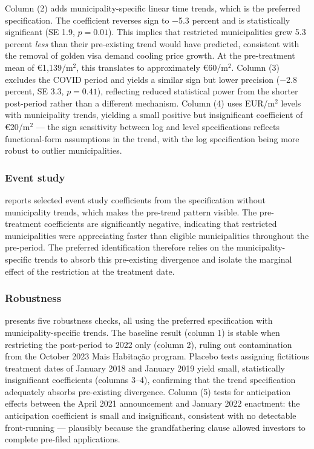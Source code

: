 \documentclass[12pt]{article}
\begin{document}
Column (2) adds municipality-specific linear time trends, which is the preferred specification. The coefficient reverses sign to $-$5.3 percent and is statistically significant (SE 1.9, $p = 0.01$). This implies that restricted municipalities grew 5.3 percent \textit{less} than their pre-existing trend would have predicted, consistent with the removal of golden visa demand cooling price growth. At the pre-treatment mean of \euro1,139/m$^2$, this translates to approximately \euro60/m$^2$. Column (3) excludes the COVID period and yields a similar sign but lower precision ($-$2.8 percent, SE 3.3, $p = 0.41$), reflecting reduced statistical power from the shorter post-period rather than a different mechanism. Column (4) uses EUR/m$^2$ levels with municipality trends, yielding a small positive but insignificant coefficient of \euro20/m$^2$ --- the sign sensitivity between log and level specifications reflects functional-form assumptions in the trend, with the log specification being more robust to outlier municipalities.



\subsubsection*{Event study}  reports selected event study coefficients from the specification without municipality trends, which makes the pre-trend pattern visible. The pre-treatment coefficients are significantly negative, indicating that restricted municipalities were appreciating faster than eligible municipalities throughout the pre-period. The preferred identification therefore relies on the municipality-specific trends to absorb this pre-existing divergence and isolate the marginal effect of the restriction at the treatment date.



\subsubsection*{Robustness}  presents five robustness checks, all using the preferred specification with municipality-specific trends. The baseline result (column 1) is stable when restricting the post-period to 2022 only (column 2), ruling out contamination from the October 2023 Mais Habita\c{c}\~{a}o program. Placebo tests assigning fictitious treatment dates of January 2018 and January 2019 yield small, statistically insignificant coefficients (columns 3--4), confirming that the trend specification adequately absorbs pre-existing divergence. Column (5) tests for anticipation effects between the April 2021 announcement and January 2022 enactment: the anticipation coefficient is small and insignificant, consistent with no detectable front-running --- plausibly because the grandfathering clause allowed investors to complete pre-filed applications.
\end{document}

